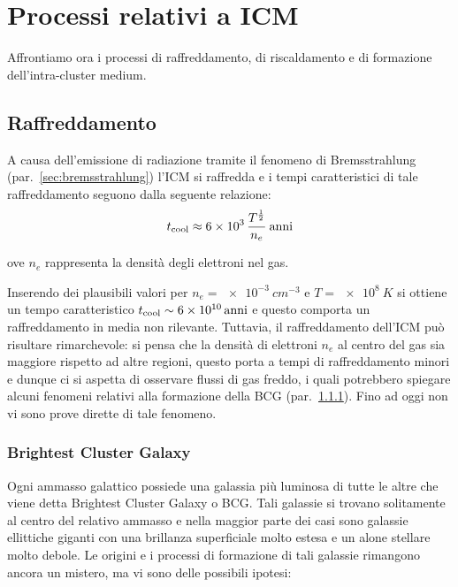 \section{Processi relativi a ICM}
Affrontiamo ora i processi di raffreddamento, di riscaldamento e di formazione dell’intra-cluster medium.

\subsection{Raffreddamento}
A causa dell’emissione di radiazione tramite il fenomeno di Bremsstrahlung (par.~\ref{sec:bremsstrahlung}) l’ICM si raffredda e i tempi caratteristici di tale raffreddamento seguono dalla seguente relazione:
\begin{equation}
    t_\textup{cool} \approx \num{6e3}\,\frac{T^{\frac{1}{2}}}{n_e}\:\si{anni}
\end{equation}

\begin{description}
    \item ove $n_e$ rappresenta la densità degli elettroni nel gas.
\end{description} 

Inserendo dei plausibili valori per $n_e = \SI{e-3}{cm^{-3}}$ e $T = \SI{e8}{K}$ si ottiene un tempo caratteristico $t_\textup{cool}\sim\SI{6e10}{anni}$ e questo comporta un raffreddamento in media non rilevante.
Tuttavia, il raffreddamento dell'ICM può risultare rimarchevole: si pensa che la densità di elettroni $n_e$ al centro del gas sia maggiore rispetto ad altre regioni, questo porta a tempi di raffreddamento minori e dunque ci si aspetta di osservare flussi di gas freddo, i quali potrebbero spiegare alcuni fenomeni relativi alla formazione della BCG (par.~\ref{sec:brightest-cluster-galaxy}). Fino ad oggi non vi sono prove dirette di tale fenomeno.

\subsubsection{Brightest Cluster Galaxy}\label{sec:brightest-cluster-galaxy}
Ogni ammasso galattico possiede una galassia più luminosa di tutte le altre che viene detta Brightest Cluster Galaxy o BCG.
Tali galassie si trovano solitamente al centro del relativo ammasso e nella maggior parte dei casi sono galassie ellittiche giganti con una brillanza superficiale molto estesa e un alone stellare molto debole.
Le origini e i processi di formazione di tali galassie rimangono ancora un mistero, ma vi sono delle possibili ipotesi:

